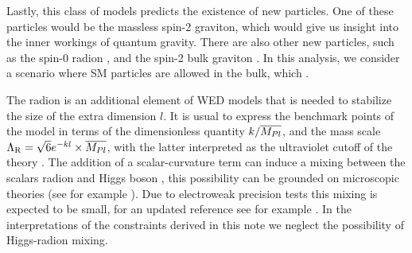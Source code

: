 Lastly, this class of models predicts the existence of new particles. One of these particles would be the massless spin-2 graviton, which would give us insight into the inner workings of quantum gravity. There are also other new particles, such as the spin-0 radion \cite{Goldberger:1999uk,DeWolfe:1999cp,Csaki:1999mp}, and the spin-2 bulk graviton \cite{Davoudiasl:1999jd,Csaki:2000zn, Agashe:2007zd}. In this analysis, we consider a scenario where SM particles are allowed in the bulk, which .




The radion is an additional element of WED models that is needed to stabilize the size of the extra dimension $l$. It is usual to express the benchmark points of the model in terms of the dimensionless quantity $k/\overline{M_{Pl}}$, and the mass scale $\Lambda_{\rm R} = \sqrt{6} e^{-kl}\times \overline{M_{Pl}}$, with the latter interpreted as the ultraviolet cutoff of the theory \cite{Giudice:2000av}. 
The addition of a scalar-curvature term can induce a mixing between the
scalars radion and Higgs boson \cite{Giudice:2000av,Dominici:2002jv}, this possibility can be grounded on microscopic theories (see for example \cite{Antoniadis:2002ut}).
Due to electroweak precision tests this mixing is expected to be small, for an updated reference see for example \cite{Desai:2013pga}.
In the interpretations of the constraints derived in this note we neglect the possibility of Higgs-radion mixing. 

